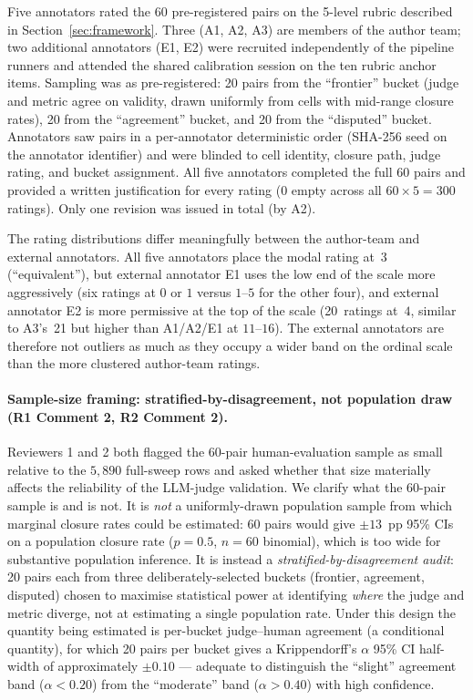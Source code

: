 Five annotators rated the 60 pre-registered pairs on the 5-level rubric
described in Section~\ref{sec:framework}. Three (A1, A2, A3) are members
of the author team; two additional annotators (E1, E2) were recruited
independently of the pipeline runners and attended the shared calibration
session on the ten rubric anchor items. Sampling was as pre-registered:
20 pairs from the ``frontier'' bucket (judge and metric agree on
validity, drawn uniformly from cells with mid-range closure rates), 20
from the ``agreement'' bucket, and 20 from the ``disputed'' bucket.
Annotators saw pairs in a per-annotator deterministic order (SHA-256
seed on the annotator identifier) and were blinded to cell identity,
closure path, judge rating, and bucket assignment. All five annotators
completed the full 60 pairs and provided a written justification for
every rating (0 empty across all $60 \times 5 = 300$ ratings). Only
one revision was issued in total (by A2).

The rating distributions differ meaningfully between the author-team and
external annotators. All five annotators place the modal rating at~3
(``equivalent''), but external annotator E1 uses the low end of the
scale more aggressively (six ratings at $0$ or $1$ versus $1$--$5$ for
the other four), and external annotator E2 is more permissive at the
top of the scale (20~ratings at~$4$, similar to A3's~21 but higher than
A1/A2/E1 at $11$--$16$). The external annotators are therefore not
outliers as much as they occupy a wider band on the ordinal scale than
the more clustered author-team ratings.

\paragraph{Sample-size framing: stratified-by-disagreement, not population draw (R1 Comment 2, R2 Comment 2).}
Reviewers 1 and 2 both flagged the 60-pair human-evaluation sample as small relative to the $5{,}890$ full-sweep rows and asked whether that size materially affects the reliability of the LLM-judge validation. We clarify what the 60-pair sample is and is not. It is \emph{not} a uniformly-drawn population sample from which marginal closure rates could be estimated: 60 pairs would give $\pm 13$~pp 95\% CIs on a population closure rate ($p = 0.5$, $n = 60$ binomial), which is too wide for substantive population inference. It is instead a \emph{stratified-by-disagreement audit}: 20 pairs each from three deliberately-selected buckets (frontier, agreement, disputed) chosen to maximise statistical power at identifying \emph{where} the judge and metric diverge, not at estimating a single population rate. Under this design the quantity being estimated is per-bucket judge--human agreement (a conditional quantity), for which 20 pairs per bucket gives a Krippendorff's $\alpha$ 95\% CI half-width of approximately $\pm 0.10$ --- adequate to distinguish the ``slight'' agreement band ($\alpha < 0.20$) from the ``moderate'' band ($\alpha > 0.40$) with high confidence.

